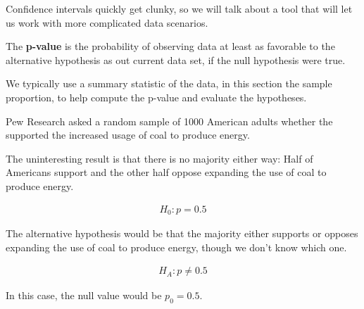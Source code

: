 \documentclass{beamer}
\begin{document}
\begin{frame}
  \begin{note}
    Confidence intervals quickly get clunky, so we will talk about a tool that will let us work with more complicated data scenarios.
  \end{note}\pause
  
  \begin{definition}
    The \textbf{p-value} is the probability of observing data at least as favorable to the alternative hypothesis as out current data set, if the null hypothesis were true.
  \end{definition}\pause

  \begin{note}
    We typically use a summary statistic of the data, in this section the sample proportion, to help compute the p-value and evaluate the hypotheses.
  \end{note}
\end{frame}

\begin{frame}
  \begin{example}
    Pew Research asked a random sample of 1000 American adults whether the supported the increased usage of coal to produce energy.\pause

    \vspace{1mm}
    The uninteresting result is that there is no majority either way: Half of Americans support and the other half oppose expanding the use of coal to produce energy.

    \vspace{-2mm}
    \begin{equation*}
      \begin{aligned}
        H_0: p=0.5
      \end{aligned}
    \end{equation*}\pause

    \vspace{-4mm}
    The alternative hypothesis would be that the majority either supports or opposes expanding the use of coal to produce energy, though we don't know which one.

    \vspace{-2mm}
    \begin{equation*}
      \begin{aligned}
        H_A: p\neq 0.5
      \end{aligned}
    \end{equation*}
  \end{example}\pause

  \begin{note}
    In this case, the null value would be $p_0=0.5$.
  \end{note}
\end{frame}
\end{document}
